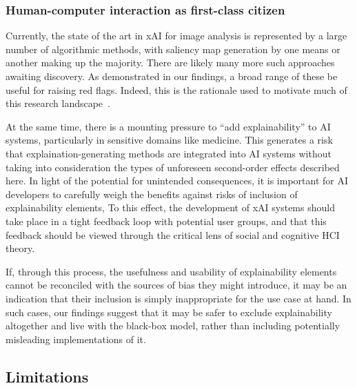 

\subsubsection{Human-computer interaction as first-class citizen}

Currently, the state of the art in xAI for image analysis is represented by a large number of algorithmic methods, with saliency map generation by one means or another making up the majority. There are likely many more such approaches awaiting discovery. As demonstrated in our findings, a broad range of these be useful for raising red flags. Indeed, this is the rationale used to motivate much of this research landscape~\cite{ribeiro2016trust}. 

At the same time, there is a mounting pressure to ``add explainability'' to AI systems, particularly in sensitive domains like medicine. This generates a risk that explaination-generating methods are integrated into AI systems without taking into consideration the types of unforeseen second-order effects described here. In light of the potential for unintended consequences, it is important for AI developers to carefully weigh the benefits against risks of inclusion of explainability elements, To this effect, the development of xAI systems should take place in a tight feedback loop with potential user groups, and that this feedback should be viewed through the critical lens of social and cognitive HCI theory. 

If, through this process, the usefulness and usability of explainability elements cannot be reconciled with the sources of bias they might introduce, it may be an indication that their inclusion is simply inappropriate for the use case at hand. In such cases, our findings suggest that it may be safer to exclude explainability altogether and live with the black-box model, rather than including potentially misleading implementations of it.

\subsection{Limitations}

